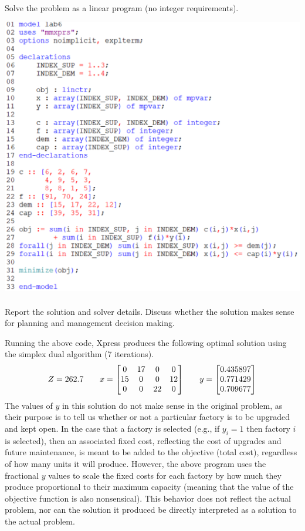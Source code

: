 \documentclass[12pt]{article}
\newenvironment{fullbox}{\begin{lrbox}{\savefullbox}\begin{minipage}{\dimexpr\textwidth-2\fboxsep\relax}}{\end{minipage}\end{lrbox}\begin{center}\framebox[\textwidth]{\usebox{\savefullbox}}\end{center}}
\newenvironment{pbox}[1][]{\begin{fullbox}\ifx#1\empty\else\paragraph{#1}\fi}{\end{fullbox}}
\theoremstyle{definition}
\begin{document}
\thispagestyle{title}


\begin{pbox}
    Solve the problem as a linear program (no integer requirements). 
\end{pbox}

\begin{center}
    \includegraphics[width=\textwidth]{code1.png}
\end{center}



\newpage
\begin{pbox}
    Report the solution and solver details. Discuss whether the solution makes sense for planning and management decision making.
\end{pbox}

Running the above code, Xpress produces the following optimal solution using the simplex dual algorithm (7 iterations).
\[
    Z = 262.7
    \qquad
    x = \mqty[
        0 & 17 & 0 & 0 \\
        15 & 0 & 0 & 12 \\
        0 & 0 & 22 & 0
    ]
    \qquad
    y = \mqty[0.435897 \\ 0.771429 \\ 0.709677]
\]
The values of $y$ in this solution do not make sense in the original problem, as their purpose is to tell us whether or not a particular factory is to be upgraded and kept open. In the case that a factory is selected (e.g., if $y_i = 1$ then factory $i$ is selected), then an associated fixed cost, reflecting the cost of upgrades and future maintenance, is meant to be added to the objective (total cost), regardless of how many units it will produce. However, the above program uses the fractional $y$ values to scale the fixed costs for each factory by how much they produce proportional to their maximum capacity (meaning that the value of the objective function is also nonsensical). This behavior does not reflect the actual problem, nor can the solution it produced be directly interpreted as a solution to the actual problem.
\end{document}
